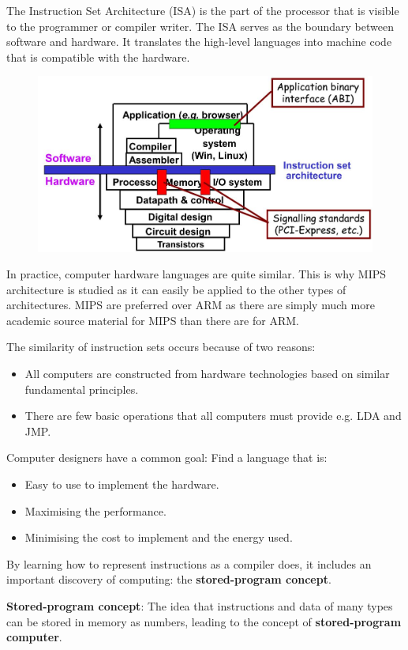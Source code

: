 \documentclass[10pt,a4paper]{article}
\begin{document}
The Instruction Set Architecture (ISA) is the part of the processor that is visible to the
programmer or compiler writer. The ISA serves as the boundary between software and hardware. It
translates the high-level languages into machine code that is compatible with the hardware.

\begin{figure} [h!]
    \centering
    \includegraphics[scale=0.3]{ISA layers.JPG}
\end{figure}

In practice, computer hardware languages are quite similar. This is why MIPS architecture is studied as it
can easily be applied to the other types of architectures. MIPS are preferred over ARM as there are
simply much more academic source material for MIPS than there are for ARM. 

The similarity of instruction sets occurs because of two reasons:
\begin{itemize}
    \item All computers are constructed from hardware technologies based on similar fundamental
    principles.
    \item There are few basic operations that all computers must provide e.g. LDA and JMP.
\end{itemize} 
Computer designers have a common goal: Find a language that is: 
    \begin{itemize}
        \item Easy to use to implement the hardware.
        \item Maximising the performance.
        \item Minimising the cost to implement and the energy used.
    \end{itemize} 

By learning how to represent instructions as a compiler does, it includes an important discovery of
computing: the \textbf{stored-program concept}.
\begin{tcolorbox}[breakable,colback=white]
\textbf{Stored-program concept}: The idea that instructions and data of many types can be stored in
memory as numbers, leading to the concept of \textbf{stored-program computer}.
\end{tcolorbox}
\end{document}
